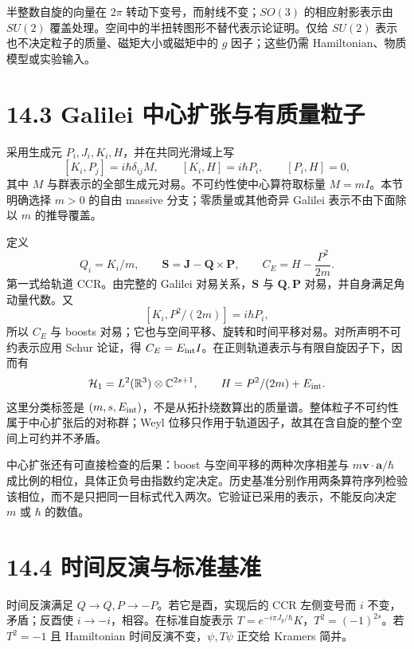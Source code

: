 \documentclass[
  11pt,
  oneside]{book}
\begin{document}
半整数自旋的向量在 \(2\pi\) 转动下变号，而射线不变；\(SO(3)\)
的相应射影表示由 \(SU(2)\)
覆盖处理。空间中的半扭转图形不替代表示论证明。仅给 \(SU(2)\)
表示也不决定粒子的质量、磁矩大小或磁矩中的 \(g\) 因子；这些仍需
Hamiltonian、物质模型或实验输入。

\hypertarget{galilei-ux4e2dux5fc3ux6269ux5f20ux4e0eux6709ux8d28ux91cfux7c92ux5b50}{%
\section{14.3 Galilei
中心扩张与有质量粒子}\label{galilei-ux4e2dux5fc3ux6269ux5f20ux4e0eux6709ux8d28ux91cfux7c92ux5b50}}

采用生成元 \(P_i,J_i,K_i,H\)，并在共同光滑域上写 \[
[K_i,P_j]=i\hbar\delta_{ij}M,\qquad
[K_i,H]=i\hbar P_i,\qquad [P_i,H]=0,
\] 其中 \(M\) 与群表示的全部生成元对易。不可约性使中心算符取标量
\(M=mI\)。本节明确选择 \(m>0\) 的自由 massive 分支；零质量或其他奇异
Galilei 表示不由下面除以 \(m\) 的推导覆盖。

定义 \[
Q_i=K_i/m,\qquad
\mathbf S=\mathbf J-\mathbf Q\times\mathbf P,
\qquad C_E=H-\frac{P^2}{2m}.
\] 第一式给轨道 CCR。由完整的 Galilei 对易关系，\(\mathbf S\) 与
\(\mathbf Q,\mathbf P\) 对易，并自身满足角动量代数。又 \[
[K_i,P^2/(2m)]=i\hbar P_i,
\] 所以 \(C_E\) 与 boosts
对易；它也与空间平移、旋转和时间平移对易。对所声明不可约表示应用 Schur
论证，得 \(C_E=E_{\rm int}I\)。在正则轨道表示与有限自旋因子下，因而有 \[
\mathcal H_1=L^2(\mathbb R^3)\otimes\mathbb C^{2s+1},\qquad
H=P^2/(2m)+E_{\rm int}.
\] 这里分类标签是
\((m,s,E_{\rm int})\)，不是从拓扑绕数算出的质量谱。整体粒子不可约性属于中心扩张后的对称群；Weyl
位移只作用于轨道因子，故其在含自旋的整个空间上可约并不矛盾。

中心扩张还有可直接检查的后果：boost 与空间平移的两种次序相差与
\(m\mathbf v\cdot\mathbf a/\hbar\)
成比例的相位，具体正负号由指数约定决定。历史基准分别作用两条算符序列检验该相位，而不是只把同一目标式代入两次。它验证已采用的表示，不能反向决定
\(m\) 或 \(\hbar\) 的数值。

\hypertarget{ux65f6ux95f4ux53cdux6f14ux4e0eux6807ux51c6ux57faux51c6}{%
\section{14.4
时间反演与标准基准}\label{ux65f6ux95f4ux53cdux6f14ux4e0eux6807ux51c6ux57faux51c6}}

时间反演满足 \(Q\to Q,P\to-P\)。若它是酉，实现后的 CCR 左侧变号而 \(i\)
不变，矛盾；反酉使 \(i\to-i\)，相容。在标准自旋表示
\(T=e^{-i\pi J_y/\hbar}K\)，\(T^2=(-1)^{2s}\)。若 \(T^2=-1\) 且
Hamiltonian 时间反演不变，\(\psi,T\psi\) 正交给 Kramers 简并。
\end{document}
